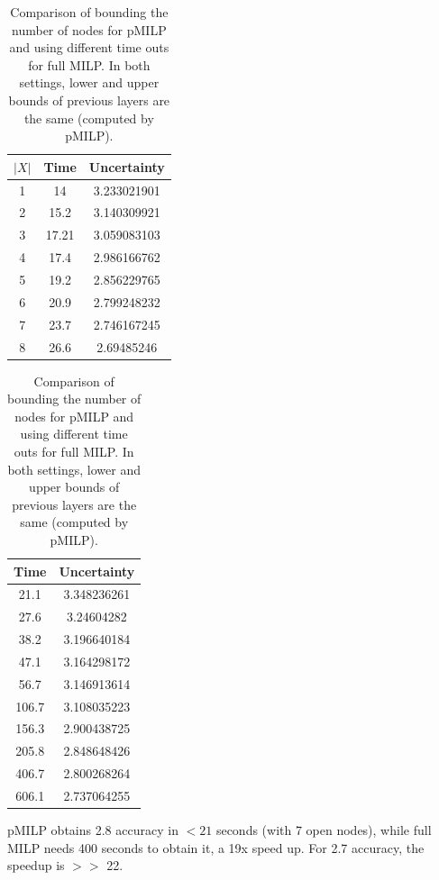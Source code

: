 {\begin{table}[h!]
	\centering
	\hspace*{4ex}
\begin{subtable}[b]{0.45\textwidth}
	\centering
		\begin{tabular}{|c|c|c|}
	\hline
		$|X|$ & Time & Uncertainty\\ 
	\hline1 &	14 & 3.233021901\\
\hline	2 & 15.2 & 3.140309921\\
\hline	3 & 17.21 & 3.059083103\\
\hline 4 &	17.4 & 2.986166762\\
\hline	5 &19.2 & 2.856229765\\
\hline	6 &20.9 & 2.799248232\\
\hline	7 &23.7 & 2.746167245\\
\hline	8 &26.6 & 2.69485246\\	
	\hline
	\end{tabular}
	\caption{pMILP}
\end{subtable}
\hfill
\begin{subtable}[b]{0.45\textwidth}
	\centering
		\begin{tabular}{|c|c|}
		\hline
		Time & Uncertainty\\ 
		\hline	21.1 & 3.348236261\\
		\hline	27.6 & 3.24604282\\
		\hline	38.2 & 3.196640184\\
		\hline	47.1 & 3.164298172\\
		\hline	56.7 & 3.146913614\\
		\hline	106.7 & 3.108035223\\
		\hline	156.3 & 2.900438725\\
		\hline	205.8 & 2.848648426\\	
		\hline	406.7 & 2.800268264 \\	
		\hline	606.1 & 2.737064255\\	
		\hline
	\end{tabular}
		\caption{full MILP}
\end{subtable}
	\caption{Comparison of bounding the number of nodes for pMILP and 
	using different time outs for full MILP. In both settings, lower and upper bounds of previous layers are the same (computed by pMILP).}
	\label{table12}
	\end{table}

	

	

pMILP obtains 2.8 accuracy in $<21$ seconds (with 7 open nodes), while full MILP needs 400 seconds to obtain it, a 19x speed up. For 2.7 accuracy, the speedup is $>>$ 22.



}
